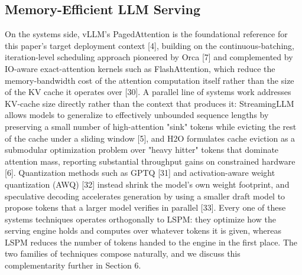 \subsection{Memory-Efficient LLM Serving}
On the systems side, vLLM's PagedAttention is the foundational reference for this paper's target deployment context [4], building on the continuous-batching, iteration-level scheduling approach pioneered by Orca [7] and complemented by IO-aware exact-attention kernels such as FlashAttention, which reduce the memory-bandwidth cost of the attention computation itself rather than the size of the KV cache it operates over [30]. A parallel line of systems work addresses KV-cache size directly rather than the context that produces it: StreamingLLM allows models to generalize to effectively unbounded sequence lengths by preserving a small number of high-attention "sink" tokens while evicting the rest of the cache under a sliding window [5], and H2O formulates cache eviction as a submodular optimization problem over "heavy hitter" tokens that dominate attention mass, reporting substantial throughput gains on constrained hardware [6]. Quantization methods such as GPTQ [31] and activation-aware weight quantization (AWQ) [32] instead shrink the model's own weight footprint, and speculative decoding accelerates generation by using a smaller draft model to propose tokens that a larger model verifies in parallel [33]. Every one of these systems techniques operates orthogonally to LSPM: they optimize how the serving engine holds and computes over whatever tokens it is given, whereas LSPM reduces the number of tokens handed to the engine in the first place. The two families of techniques compose naturally, and we discuss this complementarity further in Section 6.

